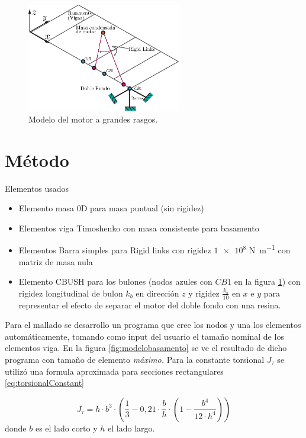 \documentclass[onecolumn,10pt,titlepage,a4paper]{article}
\begin{document}
\begin{figure}[htb!]
	\centering
	\includegraphics[width=0.6\textwidth]{fig/modelomotor.eps}
	\caption{Modelo del motor a grandes rasgos.}
	\label{fig:modelomotor}
\end{figure}

\section{Método}

Elementos usados
\begin{itemize}
	\item Elemento masa 0D para masa puntual (sin rigidez)
	\item Elementos viga Timoshenko con masa consistente para basamento
	\item Elementos Barra simples para Rigid links con rigidez $\num{1e8}$ \si{\newton \per \meter} con matriz de masa nula
	\item Elemento CBUSH para los bulones (nodos azules con $CB1$ en la figura \ref{fig:modelomotor}) con rigidez longitudinal de bulon $k_b$ en dirección $z$ y rigidez $\frac{k_b}{10}$ en $x$ e $y$ para representar el efecto de separar el motor del doble fondo con una resina.
\end{itemize}

Para el mallado se desarrollo un programa que cree los nodos y una los elementos automáticamente, tomando como input del usuario el tamaño nominal de los elementos viga. En la figura \ref{fig:modelobasamento} se ve el resultado de dicho programa con tamaño de elemento \textit{máximo.} Para la constante torsional $J_\tau$ se utilizó una formula aproximada para secciones rectangulares \eqref{eq:torsionalConstant}

\begin{equation} \label{eq:torsionalConstant}
J_{\tau}=h \cdot b^{3} \cdot\left(\frac{1}{3}-0,21 \cdot \frac{b}{h} \cdot\left(1-\frac{b^{4}}{12 \cdot h^{4}}\right)\right)
\end{equation}
donde $b$ es el lado corto y $h$ el lado largo.
\end{document}
